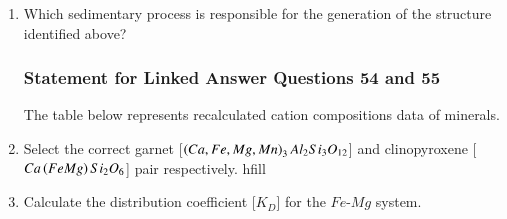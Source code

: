 \documentclass[journal,12pt,onecolumn]{IEEEtran}
\theoremstyle{remark}
\begin{document}
\begin{enumerate}
        \item Which sedimentary process is responsible for the generation of the structure identified above? \hfill{}
            \begin{enumerate}
            \end{enumerate}
\subsubsection*{Statement for Linked Answer Questions 54 and 55}
    The table below represents recalculated cation compositions data of minerals.

    \begin{table}[H]
        
    \end{table}

        \item Select the correct garnet [$\left(Ca,Fe,Mg,Mn\right)_3Al_2Si_3O_{12}$] and clinopyroxene [$Ca\left(FeMg\right)Si_2O_6$] pair respectively. hfill{}
            \begin{enumerate}
            \end{enumerate}
            
        \item Calculate the distribution coefficient [$K_D$] for the $Fe\text{-}Mg$ system. \hfill{}
            \begin{enumerate}
            \end{enumerate}
    \newpage
\begin{center}

\end{center}
\end{enumerate}
\end{document}
